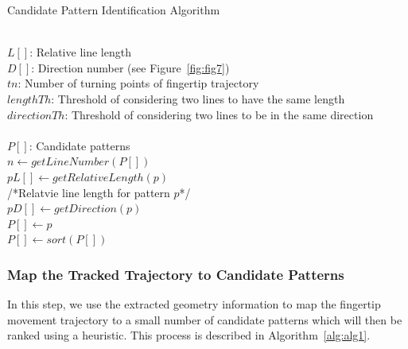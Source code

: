 \renewcommand{\algorithmicforall}{\textbf{for each}}
    \begin{algorithm}[!t]
        \caption{Candidate Pattern Identification Algorithm}
        \label{alg:alg1}
        \begin{algorithmic}[1]
            \REQUIRE~~\\
                $L[]$: Relative line length \\
                $D[]$: Direction number (see Figure~\ref{fig:fig7}) \\
                $tn$: Number of turning points of fingertip trajectory \\
                $lengthTh$: Threshold of considering two lines to have the same length\\
                $directionTh$: Threshold of considering two lines to be in the same direction\\
            \ENSURE~~\\
                $P[]$: Candidate patterns \\

                \STATE $n \leftarrow getLineNumber(P[])$ \\
                \STATE $pL[]  \leftarrow getRelativeLength(p)$ \\
                /*Relatvie line length for pattern $p$*/ \\
                \STATE $pD[] \leftarrow getDirection(p)$ \\
                        \STATE $P[] \leftarrow p$\\
                    \ENDIF
                \ENDIF
            \ENDFOR
            \STATE $P[] \leftarrow sort(P[])$
        \end{algorithmic}
    \end{algorithm}

    \subsubsection{Map the Tracked Trajectory to Candidate Patterns\label{section:identity}}
       In this step, we use the extracted geometry information to map the fingertip movement trajectory to a small number of candidate patterns which will then be ranked using a heuristic. This process is described in Algorithm~\ref{alg:alg1}.

